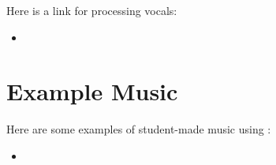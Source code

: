 \documentclass{article}
\begin{document}
Here is a link for processing vocals:

\begin{itemize}
\item
\end{itemize}

\section*{Example Music}

Here are some examples of student-made music using \songlib:

\begin{itemize}
\item
\end{itemize}
\end{document}
